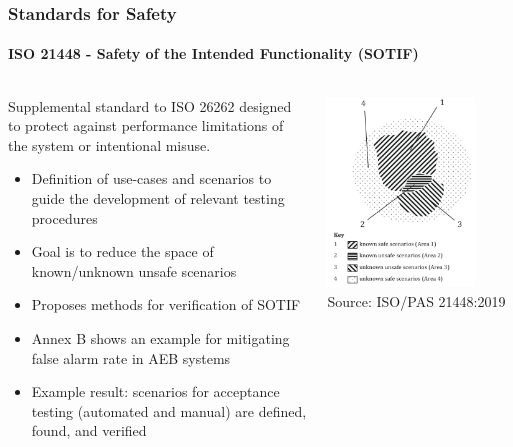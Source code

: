 \begin{frame}
\frametitle{Standards for Safety}
\framesubtitle{ISO 21448 - Safety of the Intended Functionality (SOTIF)}
\begin{columns}[]
    \begin{column}{0.65\textwidth}
        Supplemental standard to ISO 26262 designed to protect against
        performance limitations of the system or intentional misuse.
        \begin{itemize}
            \item Definition of use-cases and scenarios to guide the development
                of relevant testing procedures
            \item Goal is to reduce the space of known/unknown unsafe scenarios
            \item Proposes methods for verification of SOTIF
            \item Annex B shows an example for mitigating
                false alarm rate in AEB systems
            \item Example result: scenarios for acceptance testing (automated
                and manual) are defined, found, and verified
        \end{itemize}
    \end{column}
    \begin{column}{0.35\textwidth}
        \centering
        \includegraphics[width=0.80\textwidth]{images/sotif_scenarios.png}\\
        \footnotesize Source: ISO/PAS 21448:2019 \cite{ISO21448}
    \end{column}
\end{columns}
\end{frame}

